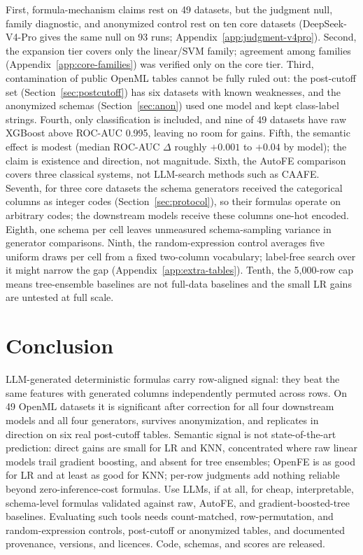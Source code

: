 First, formula-mechanism claims rest on 49 datasets, but the judgment null, family diagnostic, and anonymized control rest on ten core datasets (DeepSeek-V4-Pro gives the same null on 93 runs; Appendix~\ref{app:judgment-v4pro}). Second, the expansion tier covers only the linear/SVM family; agreement among families (Appendix~\ref{app:core-families}) was verified only on the core tier. Third, contamination of public OpenML tables cannot be fully ruled out: the post-cutoff set (Section~\ref{sec:postcutoff}) has six datasets with known weaknesses, and the anonymized schemas (Section~\ref{sec:anon}) used one model and kept class-label strings. Fourth, only classification is included, and nine of 49 datasets have raw XGBoost above ROC-AUC 0.995, leaving no room for gains. Fifth, the semantic effect is modest (median ROC-AUC \(\Delta\) roughly \(+0.001\) to \(+0.04\) by model); the claim is existence and direction, not magnitude. Sixth, the AutoFE comparison covers three classical systems, not LLM-search methods such as CAAFE. Seventh, for three core datasets the schema generators received the categorical columns as integer codes (Section~\ref{sec:protocol}), so their formulas operate on arbitrary codes; the downstream models receive these columns one-hot encoded. Eighth, one schema per cell leaves unmeasured schema-sampling variance in generator comparisons. Ninth, the random-expression control averages five uniform draws per cell from a fixed two-column vocabulary; label-free search over it might narrow the gap (Appendix~\ref{app:extra-tables}). Tenth, the 5,000-row cap means tree-ensemble baselines are not full-data baselines and the small LR gains are untested at full scale.

\section{Conclusion}\label{sec:conclusion}

LLM-generated deterministic formulas carry row-aligned signal: they beat the same features with generated columns independently permuted across rows. On 49 OpenML datasets it is significant after correction for all four downstream models and all four generators, survives anonymization, and replicates in direction on six real post-cutoff tables. Semantic signal is not state-of-the-art prediction: direct gains are small for LR and KNN, concentrated where raw linear models trail gradient boosting, and absent for tree ensembles; OpenFE is as good for LR and at least as good for KNN; per-row judgments add nothing reliable beyond zero-inference-cost formulas. Use LLMs, if at all, for cheap, interpretable, schema-level formulas validated against raw, AutoFE, and gradient-boosted-tree baselines. Evaluating such tools needs count-matched, row-permutation, and random-expression controls, post-cutoff or anonymized tables, and documented provenance, versions, and licences. Code, schemas, and scores are released.

